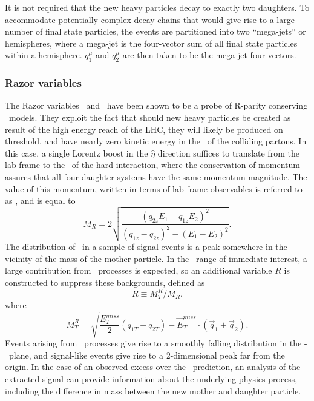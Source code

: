 It is not required that the new heavy particles decay to exactly two daughters. To accommodate potentially complex decay chains that would give rise to a large number of final state particles, the events are partitioned into two ``mega-jets''\cite{Aad:2012naa} or hemispheres, where a mega-jet is the four-vector sum of all final state particles within a hemisphere. $q_1 ^\mu$ and $q_2 ^\mu$ are then taken to be the mega-jet four-vectors. 


\subsubsection{Razor variables}
The Razor variables \cite{Rogan:2010kb} \RazorMr~and \RazorRsq~have been shown \cite{Chatrchyan:2012uea} to be a probe of R-parity conserving \SUSY~models. They exploit the fact that should new heavy particles be created as result of the high energy reach of the LHC, they will likely be produced on threshold, and have nearly zero kinetic energy in the \CMframe~of the colliding partons. In this case, a single Lorentz boost in the $\hat{\eta}$ direction suffices to translate from the lab frame to the \CMframe~of the hard interaction, where the conservation of momentum assures that all four daughter systems have the same momentum magnitude. The value of this momentum, written in terms of lab frame observables is referred to as \RazorMr, and is equal to
\begin{equation}
M_{R}=2\sqrt{\frac{(q_{2z}E_{1}-q_{1z}E_{2})^2}{(q_{1z}-q_{2z})^2-(E_{1}-E_{2})^2}}.
\label{eq:Mr}
\end{equation}
The distribution of \RazorMr~in a sample of signal events is a peak somewhere in the vicinity of the mass of the mother particle. In the \RazorMr~range of immediate interest, a large contribution from \SM~processes is expected, so an additional variable $R$ is constructed to suppress these backgrounds, defined as
\begin{equation}
\label{eq:R}
R\equiv M_{T}^{R}/M_{R}.
\end{equation}
where
\begin{equation}
M_{T}^{R}=\sqrt{\frac{E_{T}^{miss}}{2}(q_{1T}+q_{2T})-\vec{E}_{T}^{miss}\cdot(\vec{q}_1+\vec{q}_2)}.
\end{equation}
Events arising from \SM~processes give rise to a smoothly falling distribution in the \RazorRsq-\RazorMr~plane, and signal-like events give rise to a 2-dimensional peak far from the origin. In the case of an observed excess over the \SM~prediction, an analysis of the extracted signal can provide information about the underlying physics process, including the difference in mass between the new mother and daughter particle.

